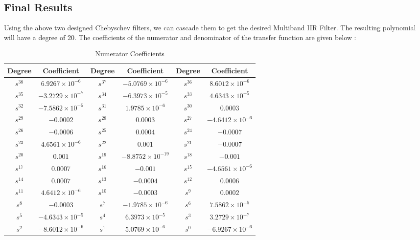 \documentclass{article}
\begin{document}
\subsection{Final Results}
Using the above two designed Chebyschev filters, we can cascade them to get the desired Multiband IIR Filter. The resulting polynomial will have a degree of 20. The coefficients of the numerator and denominator of the transfer function are given below :
\begin{table}[H]
    \centering
    \begin{adjustwidth}{0cm}{}
        \caption{Numerator Coefficients}
        \begin{tabular}{|c|c|c|c|c|c|}
            \hline
            Degree & Coefficient & Degree & Coefficient & Degree & Coefficient \\
            \hline
            $s^{38}$ & $6.9267 \times 10^{-6}$ & $s^{37}$ & $-5.0769 \times 10^{-6}$ & $s^{36}$ & $8.6012 \times 10^{-6}$ \\
            \hline
            $s^{35}$ & $-3.2729 \times 10^{-7}$ & $s^{34}$ & $-6.3973 \times 10^{-5}$ & $s^{33}$ & $4.6343 \times 10^{-5}$ \\
            \hline
            $s^{32}$ & $-7.5862 \times 10^{-5}$ & $s^{31}$ & $1.9785 \times 10^{-6}$ & $s^{30}$ & $0.0003$ \\
            \hline
            $s^{29}$ & $-0.0002$ & $s^{28}$ & $0.0003$ & $s^{27}$ & $-4.6412 \times 10^{-6}$ \\
            \hline
            $s^{26}$ & $-0.0006$ & $s^{25}$ & $0.0004$ & $s^{24}$ & $-0.0007$ \\
            \hline
            $s^{23}$ & $4.6561 \times 10^{-6}$ & $s^{22}$ & $0.001$ & $s^{21}$ & $-0.0007$ \\
            \hline
            $s^{20}$ & $0.001$ & $s^{19}$ & $-8.8752 \times 10^{-19}$ & $s^{18}$ & $-0.001$ \\
            \hline
            $s^{17}$ & $0.0007$ & $s^{16}$ & $-0.001$ & $s^{15}$ & $-4.6561 \times 10^{-6}$ \\
            \hline
            $s^{14}$ & $0.0007$ & $s^{13}$ & $-0.0004$ & $s^{12}$ & $0.0006$ \\
            \hline
            $s^{11}$ & $4.6412 \times 10^{-6}$ & $s^{10}$ & $-0.0003$ & $s^{9}$ & $0.0002$ \\
            \hline
            $s^{8}$ & $-0.0003$ & $s^{7}$ & $-1.9785 \times 10^{-6}$ & $s^{6}$ & $7.5862 \times 10^{-5}$ \\
            \hline
            $s^{5}$ & $-4.6343 \times 10^{-5}$ & $s^{4}$ & $6.3973 \times 10^{-5}$ & $s^{3}$ & $3.2729 \times 10^{-7}$ \\
            \hline
            $s^{2}$ & $-8.6012 \times 10^{-6}$ & $s^{1}$ & $5.0769 \times 10^{-6}$ & $s^{0}$ & $-6.9267 \times 10^{-6}$ \\
            \hline
        \end{tabular}
    \end{adjustwidth}
\end{table}
\end{document}

